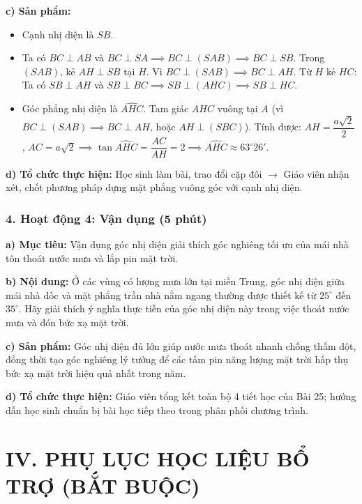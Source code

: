 \documentclass[12pt, a4paper]{article}
\begin{document}
\noindent \textbf{c) Sản phẩm:}
\begin{itemize}
    \item Cạnh nhị diện là $SB$.
    \item Ta có $BC \perp AB$ và $BC \perp SA \implies BC \perp (SAB) \implies BC \perp SB$.
    Trong $(SAB)$, kẻ $AH \perp SB$ tại $H$. Vì $BC \perp (SAB) \implies BC \perp AH$.
    Từ $H$ kẻ $HC$: Ta có $SB \perp AH$ và $SB \perp BC \implies SB \perp (AHC) \implies SB \perp HC$.
    \item Góc phẳng nhị diện là $\widehat{AHC}$. Tam giác $AHC$ vuông tại $A$ (vì $BC \perp (SAB) \implies BC \perp AH$, hoặc $AH \perp (SBC)$).
    Tính được: $AH = \dfrac{a\sqrt{2}}{2}$, $AC = a\sqrt{2} \implies \tan \widehat{AHC} = \dfrac{AC}{AH} = 2 \implies \widehat{AHC} \approx 63^\circ 26'$.
\end{itemize}

\noindent \textbf{d) Tổ chức thực hiện:}
Học sinh làm bài, trao đổi cặp đôi $\to$ Giáo viên nhận xét, chốt phương pháp dựng mặt phẳng vuông góc với cạnh nhị diện.

\subsubsection*{4. Hoạt động 4: Vận dụng (5 phút)}

\noindent \textbf{a) Mục tiêu:}
Vận dụng góc nhị diện giải thích góc nghiêng tối ưu của mái nhà tôn thoát nước mưa và lắp pin mặt trời.

\noindent \textbf{b) Nội dung:}
Ở các vùng có lượng mưa lớn tại miền Trung, góc nhị diện giữa mái nhà dốc và mặt phẳng trần nhà nằm ngang thường được thiết kế từ $25^\circ$ đến $35^\circ$. Hãy giải thích ý nghĩa thực tiễn của góc nhị diện này trong việc thoát nước mưa và đón bức xạ mặt trời.

\noindent \textbf{c) Sản phẩm:}
Góc nhị diện đủ lớn giúp nước mưa thoát nhanh chống thấm dột, đồng thời tạo góc nghiêng lý tưởng để các tấm pin năng lượng mặt trời hấp thụ bức xạ mặt trời hiệu quả nhất trong năm.

\noindent \textbf{d) Tổ chức thực hiện:}
Giáo viên tổng kết toàn bộ 4 tiết học của Bài 25; hướng dẫn học sinh chuẩn bị bài học tiếp theo trong phân phối chương trình.

\vspace{10pt}

\section*{IV. PHỤ LỤC HỌC LIỆU BỔ TRỢ (BẮT BUỘC)}
\end{document}
